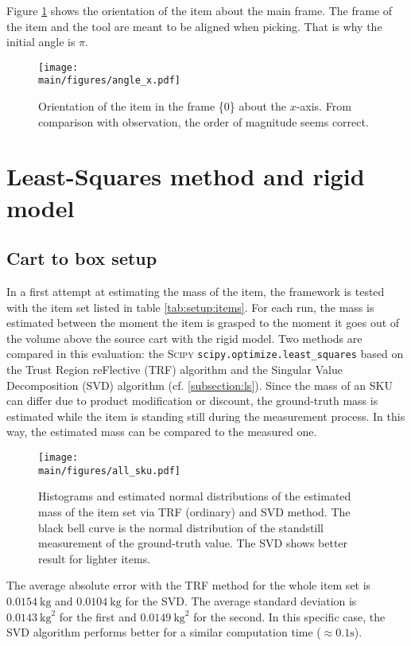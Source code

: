\documentclass[/home/francois/latex/report/main.tex]{subfiles}
\begin{document}
Figure \ref{fig:results:calibration:angle} shows the orientation of the item about the main frame. The frame of the item and the tool are meant to be aligned when picking. That is why the initial angle is $\pi$.

\begin{figure}
  \centering
  \texttt{[image: \\main/figures/angle\_x.pdf]}
  \caption{Orientation of the item in the frame \{0\} about the $x$-axis. From comparison with observation, the order of magnitude seems correct.}
  \label{fig:results:calibration:angle}
\end{figure}

\section{Least-Squares method and rigid model}

\subsection{Cart to box setup}

In a first attempt at estimating the mass of the item, the framework is tested with the item set listed in table \ref{tab:setup:items}. For each run, the mass is estimated between the moment the item is grasped to the moment it goes out of the volume above the source cart with the rigid model. Two methods are compared in this evaluation: the \textsc{Scipy} \texttt{scipy.optimize.least\_squares} based on the Trust Region reFlective (TRF) algorithm and the Singular Value Decomposition (SVD) algorithm (cf. \ref{subsection:ls}). Since the mass of an \ac{SKU} can differ due to product modification or discount, the ground-truth mass is estimated while the item is standing still during the measurement process. In this way, the estimated mass can be compared to the measured one.

\begin{figure}
  \centering
  \texttt{[image: \\main/figures/all\_sku.pdf]}
  \caption{Histograms and estimated normal distributions of the estimated mass of the item set via \ac{TRF} (ordinary) and \ac{SVD} method. The black bell curve is the normal distribution of the standstill measurement of the ground-truth value. The \ac{SVD} shows better result for lighter items.}
  \label{fig:results:rigid-ls}
\end{figure}

The average absolute error with the \ac{TRF} method for the whole item set is $0.0154 \ \si{\kilogram}$ and $0.0104 \ \si{\kilogram}$ for the \ac{SVD}. The average standard deviation is $0.0143 \ \si{\kilogram\squared}$ for the first and $0.0149 \ \si{\kilogram\squared}$ for the second. In this specific case, the \ac{SVD} algorithm performs better for a similar computation time ($\approx 0.1 \si{\second}$).
\end{document}
